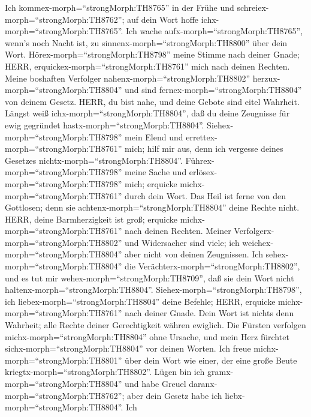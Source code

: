  Ich kommex-morph=``strongMorph:TH8765'' in der Frühe und
schreiex-morph=``strongMorph:TH8762''; auf dein Wort hoffe
ichx-morph=``strongMorph:TH8765''.  Ich wache
aufx-morph=``strongMorph:TH8765'', wenn's noch Nacht ist, zu
sinnenx-morph=``strongMorph:TH8800'' über dein Wort. 
Hörex-morph=``strongMorph:TH8798'' meine Stimme nach deiner Gnade; HERR,
erquickex-morph=``strongMorph:TH8761'' mich nach deinen Rechten.
 Meine boshaften Verfolger
nahenx-morph=``strongMorph:TH8802'' herzux-morph=``strongMorph:TH8804''
und sind fernex-morph=``strongMorph:TH8804'' von deinem Gesetz.
 HERR, du bist nahe, und deine Gebote sind eitel Wahrheit.
 Längst weiß ichx-morph=``strongMorph:TH8804'', daß du
deine Zeugnisse für ewig gegründet hastx-morph=``strongMorph:TH8804''.
 Siehex-morph=``strongMorph:TH8798'' mein Elend und
errettex-morph=``strongMorph:TH8761'' mich; hilf mir aus, denn ich
vergesse deines Gesetzes nichtx-morph=``strongMorph:TH8804''.
 Führex-morph=``strongMorph:TH8798'' meine Sache und
erlösex-morph=``strongMorph:TH8798'' mich; erquicke
michx-morph=``strongMorph:TH8761'' durch dein Wort.  Das
Heil ist ferne von den Gottlosen; denn sie
achtenx-morph=``strongMorph:TH8804'' deine Rechte nicht. 
HERR, deine Barmherzigkeit ist groß; erquicke
michx-morph=``strongMorph:TH8761'' nach deinen Rechten. 
Meiner Verfolgerx-morph=``strongMorph:TH8802'' und Widersacher sind
viele; ich weichex-morph=``strongMorph:TH8804'' aber nicht von deinen
Zeugnissen.  Ich sehex-morph=``strongMorph:TH8804'' die
Verächterx-morph=``strongMorph:TH8802'', und es tut mir
wehex-morph=``strongMorph:TH8709'', daß sie dein Wort nicht
haltenx-morph=``strongMorph:TH8804''. 
Siehex-morph=``strongMorph:TH8798'', ich
liebex-morph=``strongMorph:TH8804'' deine Befehle; HERR, erquicke
michx-morph=``strongMorph:TH8761'' nach deiner Gnade. 
Dein Wort ist nichts denn Wahrheit; alle Rechte deiner Gerechtigkeit
währen ewiglich.  Die Fürsten verfolgen
michx-morph=``strongMorph:TH8804'' ohne Ursache, und mein Herz fürchtet
sichx-morph=``strongMorph:TH8804'' vor deinen Worten.  Ich
freue michx-morph=``strongMorph:TH8801'' über dein Wort wie einer, der
eine große Beute kriegtx-morph=``strongMorph:TH8802''. 
Lügen bin ich gramx-morph=``strongMorph:TH8804'' und habe Greuel
daranx-morph=``strongMorph:TH8762''; aber dein Gesetz habe ich
liebx-morph=``strongMorph:TH8804''.  Ich
